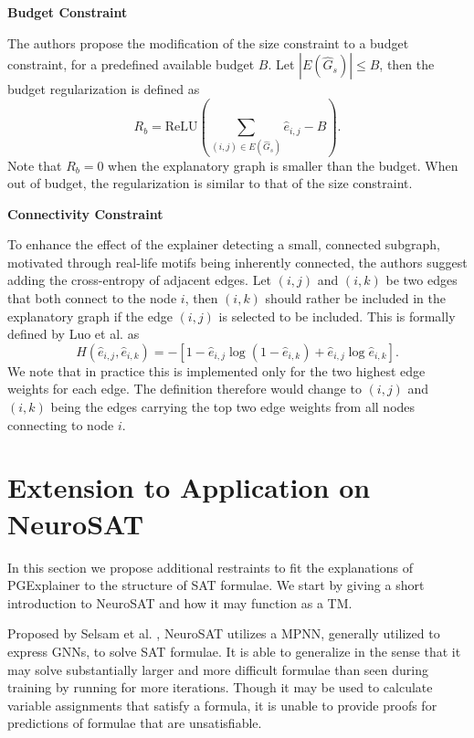 \textbf{Budget Constraint}\par
The authors propose the modification of the size constraint to a budget constraint, for a predefined available budget $B$. Let $|E(\hat{G}_s)| \leq B$, then the budget regularization is defined as
\begin{equation}
    R_b = \text{ReLU}(\sum_{(i,j)\in E(\hat{G}_s)}\hat{e}_{i,j}-B).
\end{equation}
Note that $R_b = 0$ when the explanatory graph is smaller than the budget. When out of budget, the regularization is similar to that of the size constraint. \bigskip

\textbf{Connectivity Constraint}\par
To enhance the effect of the explainer detecting a small, connected subgraph, motivated through real-life motifs being inherently connected, the authors suggest adding the cross-entropy of adjacent edges. Let $(i,j)$ and $(i,k)$ be two edges that both connect to the node $i$, then $(i,k)$ should rather be included in the explanatory graph if the edge $(i,j)$ is selected to be included. This is formally defined by Luo et al. \cite{luo2020parameterized} as
\begin{equation}
    H(\hat{e}_{i,j},\hat{e}_{i,k}) = -[1-\hat{e}_{i,j}\log(1-\hat{e}_{i,k})+\hat{e}_{i,j}\log \hat{e}_{i,k}].
\end{equation}
We note that in practice this is implemented only for the two highest edge weights for each edge. The definition therefore would change to $(i,j)$ and $(i,k)$ being the edges carrying the top two edge weights from all nodes connecting to node $i$.


\section{Extension to Application on NeuroSAT}
\label{sec:NeuroSAT_extension}
In this section we propose additional restraints to fit the explanations of PGExplainer to the structure of SAT formulae. We start by giving a short introduction to NeuroSAT\cite{selsam2018learning} and how it may function as a \ac{TM}.\bigskip

Proposed by Selsam et al. \cite{selsam2018learning}, NeuroSAT utilizes a MPNN, generally utilized to express GNNs, to solve SAT formulae. It is able to generalize in the sense that it may solve substantially larger and more difficult formulae than seen during training by running for more iterations. Though it may be used to calculate variable assignments that satisfy a formula, it is unable to provide proofs for predictions of formulae that are unsatisfiable. \bigskip

